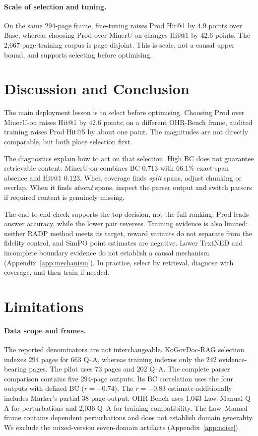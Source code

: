 \documentclass[11pt]{article}
\begin{document}
\paragraph{Scale of selection and tuning.} On the same 294-page frame, fine-tuning raises Prod Hit@1 by $4.9$ points over Base, whereas choosing Prod over MinerU-on changes Hit@1 by $42.6$ points. The 2{,}667-page training corpus is page-disjoint. This is scale, not a causal upper bound, and supports selecting before optimising.

\section{Discussion and Conclusion}

The main deployment lesson is to select before optimising. Choosing Prod over MinerU-on raises Hit@1 by $42.6$ points; on a different OHR-Bench frame, audited training raises Prod Hit@5 by about one point. The magnitudes are not directly comparable, but both place selection first.

The diagnostics explain how to act on that selection. High BC does not guarantee retrievable content: MinerU-on combines BC $0.713$ with $66.1\%$ exact-span absence and Hit@1 $0.123$. When coverage finds \emph{split} spans, adjust chunking or overlap. When it finds \emph{absent} spans, inspect the parser output and switch parsers if required content is genuinely missing.

The end-to-end check supports the top decision, not the full ranking: Prod leads answer accuracy, while the lower pair reverses. Training evidence is also limited: neither RADP method meets its target, reward variants do not separate from the fidelity control, and SimPO point estimates are negative. Lower TextNED and incomplete boundary evidence do not establish a causal mechanism (Appendix~\ref{app:mechanism}). In practice, select by retrieval, diagnose with coverage, and then train if needed.

\section*{Limitations}

\paragraph{Data scope and frames.} The reported denominators are not interchangeable. KoGovDoc-RAG selection indexes 294 pages for 663 Q--A, whereas training indexes only the 242 evidence-bearing pages. The pilot uses 73 pages and 202 Q--A. The complete parser comparison contains five 294-page outputs. Its BC correlation uses the four outputs with defined BC ($r=-0.74$). The $r=-0.83$ estimate additionally includes Marker's partial 38-page output. OHR-Bench uses 1{,}043 Law--Manual Q--A for perturbations and 2{,}036 Q--A for training compatibility. The Law--Manual frame contains dependent perturbations and does not establish domain generality. We exclude the mixed-version seven-domain artifacts (Appendix~\ref{app:noise}).
\end{document}
